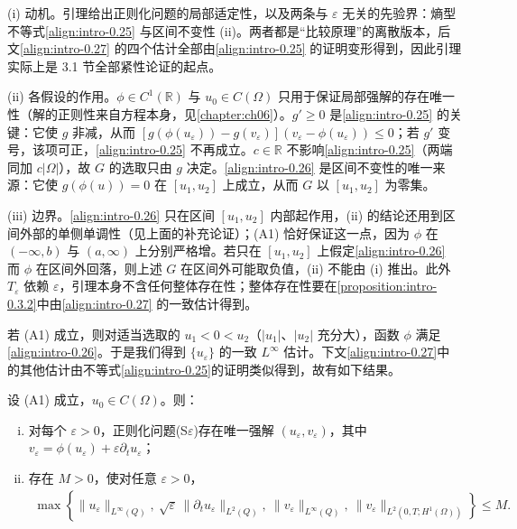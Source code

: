 \documentclass[../main.tex]{subfiles}
\begin{document}
\begin{remark}\label{remark:intro-0.3.1-动机}
(i) 动机。引理给出正则化问题的局部适定性，以及两条与 $\varepsilon$ 无关的先验界：熵型不等式\eqref{align:intro-0.25} 与区间不变性 (ii)。两者都是“比较原理”的离散版本，后文\eqref{align:intro-0.27} 的四个估计全部由\eqref{align:intro-0.25} 的证明变形得到，因此引理实际上是 3.1 节全部紧性论证的起点。

(ii) 各假设的作用。$\phi\in C^1(\mathbb{R})$ 与 $u_0\in C(\Omega)$ 只用于保证局部强解的存在唯一性（解的正则性来自方程本身，见\cref{chapter:ch06}）。$g'\geqslant0$ 是\eqref{align:intro-0.25} 的关键：它使 $g$ 非减，从而 $[g(\phi(u_\varepsilon))-g(v_\varepsilon)](v_\varepsilon-\phi(u_\varepsilon))\leqslant0$；若 $g'$ 变号，该项可正，\eqref{align:intro-0.25} 不再成立。$c\in\mathbb{R}$ 不影响\eqref{align:intro-0.25}（两端同加 $c|\Omega|$），故 $G$ 的选取只由 $g$ 决定。\eqref{align:intro-0.26} 是区间不变性的唯一来源：它使 $g(\phi(u))=0$ 在 $[u_1,u_2]$ 上成立，从而 $G$ 以 $[u_1,u_2]$ 为零集。

(iii) 边界。\eqref{align:intro-0.26} 只在区间 $[u_1,u_2]$ 内部起作用，(ii) 的结论还用到区间外部的单侧单调性（见上面的补充论证）；(A1) 恰好保证这一点，因为 $\phi$ 在 $(-\infty,b)$ 与 $(a,\infty)$ 上分别严格增。若只在 $[u_1,u_2]$ 上假定\eqref{align:intro-0.26} 而 $\phi$ 在区间外回落，则上述 $G$ 在区间外可能取负值，(ii) 不能由 (i) 推出。此外 $T_\varepsilon$ 依赖 $\varepsilon$，引理本身不含任何整体存在性；整体存在性要在\cref{proposition:intro-0.3.2}中由\eqref{align:intro-0.27} 的一致估计得到。
\end{remark}

若 (A1) 成立，则对适当选取的 $u_1<0<u_2$（$|u_1|$、$|u_2|$ 充分大），函数 $\phi$ 满足\eqref{align:intro-0.26}。于是我们得到 $\{u_\varepsilon\}$ 的一致 $L^\infty$ 估计。下文\eqref{align:intro-0.27}中的其他估计由不等式\eqref{align:intro-0.25}的证明类似得到，故有如下结果。

\begin{proposition}\label{proposition:intro-0.3.2}
设 (A1) 成立，$u_0\in C(\Omega)$。则：
\begin{enumerate}[(i)]
\item\label{item:intro-0.3.2-i} 对每个 $\varepsilon>0$，正则化问题(S$\varepsilon$)存在唯一强解 $(u_\varepsilon,v_\varepsilon)$，其中 $v_\varepsilon=\phi(u_\varepsilon)+\varepsilon\partial_t u_\varepsilon$；
\item\label{item:intro-0.3.2-ii} 存在 $M>0$，使对任意 $\varepsilon>0$，
\begin{align}
\max\left\{\|u_\varepsilon\|_{L^\infty(Q)},\ \sqrt{\varepsilon}\,\|\partial_t u_\varepsilon\|_{L^2(Q)},\ \|v_\varepsilon\|_{L^\infty(Q)},\ \|v_\varepsilon\|_{L^2(0,T;H^1(\Omega))}\right\} \leqslant M. \label{align:intro-0.27}
\end{align}
\end{enumerate}
\end{proposition}
\end{document}
